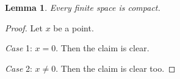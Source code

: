 \documentclass{article}
\newtheorem{lemma}{Lemma}
\begin{document}
\begin{lemma} Every finite space is compact. \end{lemma}
\begin{proof}
Let $x$ be a point.

{\it Case} 1: $x=0$. Then the claim is clear.

{\it Case} 2: $x\neq 0$. Then the claim is clear too.
\end{proof}
\end{document}
